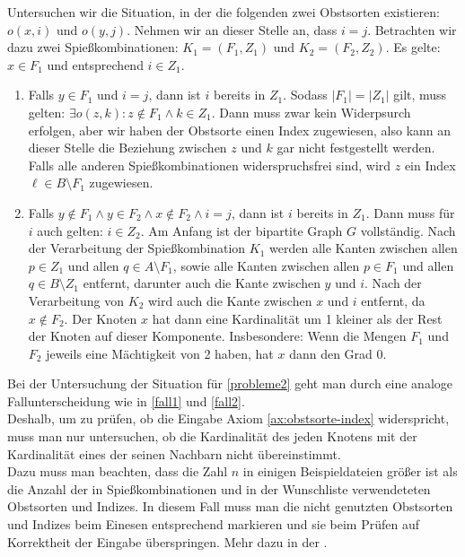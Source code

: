 Untersuchen wir die Situation, in der die folgenden 
zwei Obstsorten existieren: $o(x, i)$ und $o(y, j)$.
Nehmen wir an dieser Stelle an, dass $i=j$.
Betrachten wir dazu zwei Spießkombinationen: $K_1 = (F_1, Z_1)$ und $K_2 = (F_2, Z_2)$.
Es gelte: $x \in F_1$ und entsprechend $i \in Z_1$.
\begin{enumerate}[label={\upshape(F\arabic*)}]
  \item Falls $y \in F_1$ und $i = j$, dann ist $i$ bereits in $Z_1$. Sodass $|F_1| = |Z_1|$ gilt,
  muss gelten: $\exists o(z, k) : z \notin F_1 \land k \in Z_1$.
  Dann muss zwar kein Widerpsurch erfolgen, aber wir haben der Obstsorte einen Index zugewiesen,
  also kann an dieser Stelle die Beziehung zwischen $z$ und $k$ gar nicht festgestellt werden.
  Falls alle anderen Spießkombinationen widerspruchsfrei sind,
  wird $z$ ein Index $\ell \in B \setminus F_1$ zugewiesen.\label{fall1}

  \item Falls $y \notin F_1 \land y \in F_2 \land x \notin F_2 \land i =j$, dann ist $i$ bereits in $Z_1$.
  Dann muss für $i$ auch gelten: $i \in Z_2$. Am Anfang ist der bipartite Graph $G$ vollständig.
  Nach der Verarbeitung der Spießkombination $K_1$ werden alle Kanten zwischen allen
  $p \in Z_1$ und allen $q \in A \setminus F_1$, sowie alle Kanten zwischen allen
  $p \in F_1$ und allen $q \in B \setminus Z_1$ entfernt, darunter auch die Kante zwischen
  $y$ und $i$. Nach der Verarbeitung von $K_2$ wird auch die Kante zwischen $x$ und $i$
  entfernt, da $x \notin F_2$. Der Knoten $x$ hat dann eine Kardinalität um 1 kleiner
  als der Rest der Knoten auf dieser Komponente. Insbesondere: Wenn die Mengen
  $F_1$ und $F_2$ jeweils eine Mächtigkeit von 2 haben, hat $x$ dann den Grad 0.\label{fall2}
\end{enumerate}

Bei der Untersuchung der Situation für \ref{probleme2} geht man durch eine analoge Fallunterscheidung wie
in \ref{fall1} und \ref{fall2}.\\

Deshalb, um zu prüfen, ob die Eingabe Axiom \ref{ax:obstsorte-index} widerspricht, muss man 
nur untersuchen, ob die Kardinalität des jeden Knotens mit der Kardinalität eines der seinen 
Nachbarn nicht übereinstimmt.\\
Dazu muss man beachten, dass die Zahl $n$ in einigen Beispieldateien größer ist
als die Anzahl der in Spießkombinationen und in der Wunschliste verwendeteten Obstsorten
und Indizes. In diesem Fall muss man die nicht genutzten Obstsorten und Indizes beim Einesen
entsprechend markieren und sie beim Prüfen auf Korrektheit der Eingabe überspringen. Mehr dazu
in der .
